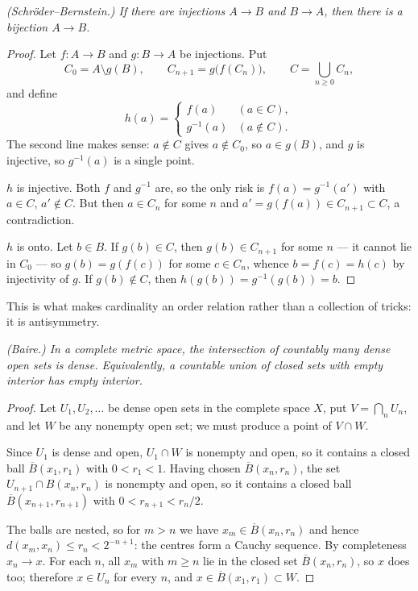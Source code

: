 \emph{(Schr\"oder--Bernstein.) If there are injections $A \to B$ and
$B \to A$, then there is a bijection $A \to B$.}
\begin{proof}
Let $f : A \to B$ and $g : B \to A$ be injections. Put
\[ C_0 = A \setminus g(B), \qquad C_{n+1} = g\bigl(f(C_n)\bigr),
   \qquad C = \bigcup_{n\ge0} C_n , \]
and define
\[ h(a) = \begin{cases}
    f(a) & (a \in C),\\
    g^{-1}(a) & (a \notin C).
  \end{cases} \]
The second line makes sense: $a \notin C$ gives $a \notin C_0$, so
$a \in g(B)$, and $g$ is injective, so $g^{-1}(a)$ is a single point.

$h$ is injective. Both $f$ and $g^{-1}$ are, so the only risk is
$f(a) = g^{-1}(a')$ with $a \in C$, $a' \notin C$. But then $a \in C_n$ for
some $n$ and $a' = g(f(a)) \in C_{n+1} \subset C$, a contradiction.

$h$ is onto. Let $b \in B$. If $g(b) \in C$, then $g(b) \in C_{n+1}$ for some
$n$ --- it cannot lie in $C_0$ --- so $g(b) = g(f(c))$ for some $c \in C_n$,
whence $b = f(c) = h(c)$ by injectivity of $g$. If $g(b) \notin C$, then
$h(g(b)) = g^{-1}(g(b)) = b$.
\end{proof}

\noindent
This is what makes cardinality an order relation rather than a collection of
tricks: it is antisymmetry.

\emph{(Baire.) In a complete metric space, the intersection of countably many
dense open sets is dense. Equivalently, a countable union of closed sets with
empty interior has empty interior.}
\begin{proof}
Let $U_1, U_2, \dots$ be dense open sets in the complete space $X$, put
$V = \bigcap_n U_n$, and let $W$ be any nonempty open set; we must produce a
point of $V \cap W$.

Since $U_1$ is dense and open, $U_1 \cap W$ is nonempty and open, so it
contains a closed ball $\overline B(x_1,r_1)$ with $0 < r_1 < 1$. Having
chosen $\overline B(x_n,r_n)$, the set $U_{n+1} \cap B(x_n,r_n)$ is nonempty
and open, so it contains a closed ball $\overline B(x_{n+1},r_{n+1})$ with
$0 < r_{n+1} < r_n/2$.

The balls are nested, so for $m > n$ we have $x_m \in \overline B(x_n,r_n)$
and hence $d(x_m,x_n) \le r_n < 2^{-n+1}$: the centres form a Cauchy
sequence. By completeness $x_n \to x$. For each $n$, all $x_m$ with $m \ge n$
lie in the closed set $\overline B(x_n,r_n)$, so $x$ does too; therefore
$x \in U_n$ for every $n$, and $x \in \overline B(x_1,r_1) \subset W$.
\end{proof}

